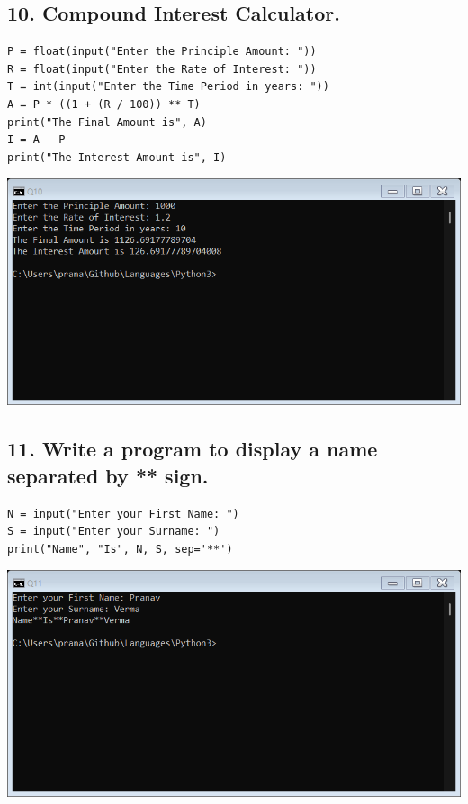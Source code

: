 \documentclass[12pt]{article}
\begin{document}
\subsection*{10. Compound Interest Calculator.}
\begin{verbatim}
P = float(input("Enter the Principle Amount: "))
R = float(input("Enter the Rate of Interest: "))
T = int(input("Enter the Time Period in years: "))
A = P * ((1 + (R / 100)) ** T)
print("The Final Amount is", A)
I = A - P
print("The Interest Amount is", I)
\end{verbatim}
\includegraphics[width=\linewidth]{images/10.png}

\subsection*{11. Write a program to display a name separated by ** sign.}
\begin{verbatim}
N = input("Enter your First Name: ")
S = input("Enter your Surname: ")
print("Name", "Is", N, S, sep='**')
\end{verbatim}
\includegraphics[width=\linewidth]{images/11.png}
\end{document}

